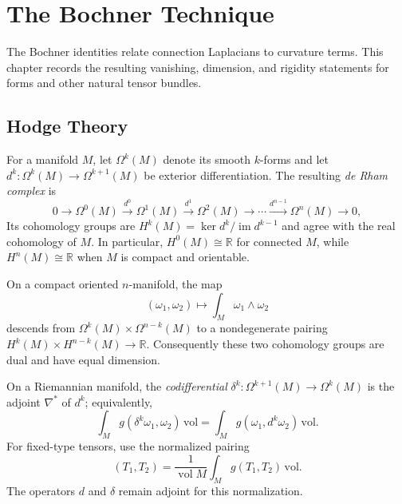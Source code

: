 \chapter{The Bochner Technique}
\label{chap:pet-the-bochner-technique}

The Bochner identities relate connection Laplacians to curvature terms.  This
chapter records the resulting vanishing, dimension, and rigidity statements
for forms and other natural tensor bundles.

\section{Hodge Theory}

\begin{definition}
  \label{def:pet-ch9-de-rham-cohomology}

  For a manifold $M$, let $\Omega^k(M)$ denote its smooth $k$-forms and let
  $d^k:\Omega^k(M)\to\Omega^{k+1}(M)$ be exterior differentiation.  The
  resulting \emph{de Rham complex} is
  \[
    0\to\Omega^0(M)\xrightarrow{d^0}\Omega^1(M)\xrightarrow{d^1}\Omega^2(M)\to\cdots
    \xrightarrow{d^{n-1}}\Omega^n(M)\to0,
  \]
  Its cohomology groups are
  $H^k(M)=\ker d^k/\operatorname{im}d^{k-1}$ and agree with the real
  cohomology of $M$.  In particular, $H^0(M)\cong\mathbb R$ for connected
  $M$, while $H^n(M)\cong\mathbb R$ when $M$ is compact and orientable.
\end{definition}

\begin{remark}
  \label{rem:pet-ch9-poincare-duality}

  On a compact oriented $n$-manifold, the map
  \[
    (\omega_1,\omega_2)\longmapsto\int_M\omega_1\wedge\omega_2
  \]
  descends from $\Omega^k(M)\times\Omega^{n-k}(M)$ to a nondegenerate pairing
  $H^k(M)\times H^{n-k}(M)\to\mathbb R$.  Consequently these two cohomology
  groups are dual and have equal dimension.
\end{remark}

\begin{definition}
  \label{def:pet-ch9-codifferential}

  On a Riemannian manifold, the \emph{codifferential}
  $\delta^k:\Omega^{k+1}(M)\to\Omega^k(M)$ is the adjoint $\nabla^*$ of $d^k$;
  equivalently,
  \[
    \int_Mg(\delta^k\omega_1,\omega_2)\,\mathrm{vol}=\int_Mg(\omega_1,d^k\omega_2)\,\mathrm{vol}.
  \]
  For fixed-type tensors, use the normalized pairing
  \[
    (T_1,T_2)=\frac1{\operatorname{vol}M}
      \int_M g(T_1,T_2)\,\mathrm{vol}.
  \]
  The operators $d$ and $\delta$ remain adjoint for this normalization.
\end{definition}

